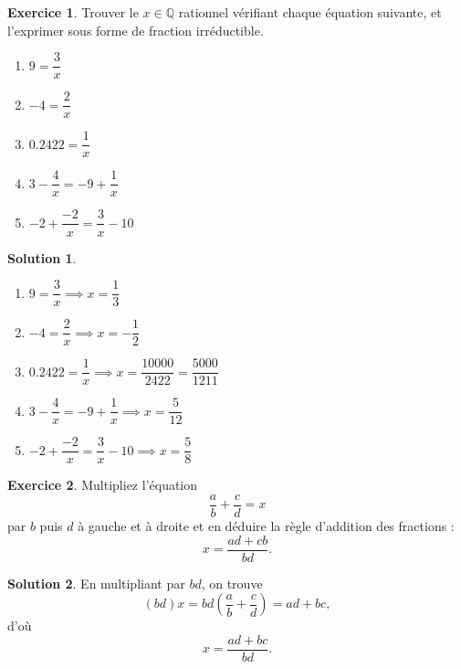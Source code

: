 \documentclass[a4paper, 14pt]{extarticle}
\theoremstyle{plain}
\theoremstyle{definition}
\newtheorem*{sol}{Solution}
\newtheorem{ex}{Exercice}
\newcommand{\Q}{\mathbb{Q}}
\newcommand{\exe}[2]{
		\begin{ex} #1  \end{ex}
		\begin{sol} #2 \end{sol}
	}
\newcommand{\exe}[2]{
		\begin{ex} #1  \end{ex}
	}
\begin{document}
\exe{
	Trouver le $x \in \Q$ rationnel vérifiant chaque équation suivante, et l'exprimer sous forme de fraction irréductible.
	
	\begin{enumerate}
		\item $9 = \dfrac3x$
		\item $-4 = \dfrac2x$
		\item $0.2422 = \dfrac1x$
		\item $3 - \dfrac4x = -9 + \dfrac1x$
		\item $-2 + \dfrac{-2}x = \dfrac3x - 10$
	\end{enumerate}

}
{
	\begin{enumerate}
		\item $9 = \dfrac3x \implies x = \dfrac13$
		\item $-4 = \dfrac2x \implies x=-\dfrac12$
		\item $0.2422 = \dfrac1x \implies x = \dfrac{10000}{2422} = \dfrac{5000}{1211}$
		\item $3 - \dfrac4x = -9 + \dfrac1x \implies x = \dfrac5{12}$
		\item $-2 + \dfrac{-2}x = \dfrac3x - 10 \implies x = \dfrac58$
	\end{enumerate}
}


\exe{
	Multipliez l'équation 
		\[ \dfrac{a}b + \dfrac{c}d = x \]
	par $b$ puis $d$ à gauche et à droite et en déduire la règle d'addition des fractions :
		\[ x = \dfrac{ad + cb}{bd}. \]
}{
	En multipliant par $bd$, on trouve
		\[ (bd) x =  bd \left( \dfrac{a}b + \dfrac{c}d \right) = ad + bc, \]
	d'où
		\[ x = \dfrac{ad+bc}{bd}. \]
}
\end{document}
